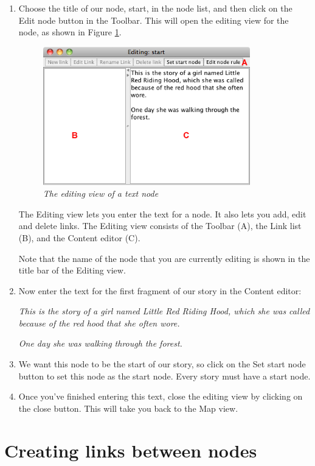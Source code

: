 \documentclass{article}
\begin{document}
\begin{enumerate}
  \item Choose the title of our node, start, in the node list, and then click
  on the Edit node button in the Toolbar. This will open the editing view for
  the node, as shown in Figure \ref{fig:edit_node}. 
  
\begin{figure}[ht]
  \centering
  \includegraphics[width=9cm]{images/hypedyn-tutorial-1-figure-5}
  \caption{\textit{The editing view of a text node}}
  \label{fig:edit_node}
\end{figure} 

The Editing view lets you enter the text for a node. It also lets you add, edit
and delete links. The Editing view consists of the Toolbar (A), the Link list (B),
and the Content editor (C).

Note that the name of the node that you are currently editing is shown in the
title bar of the Editing view.

\item Now enter the text for the first fragment of our story in the Content
editor:

\textit{This is the story of a girl named Little Red Riding Hood, which she was
called because of the red hood that she often wore.}

\textit{One day she was walking through the forest.}

\item We want this node to be the start of our story, so click on the Set start
node button to set this node as the start node. Every story must have a start node.
\item Once you've finished entering this text, close the editing view by
clicking on the close button. This will take you back to the Map view.
\end{enumerate}

\section{Creating links between nodes}
\end{document}
